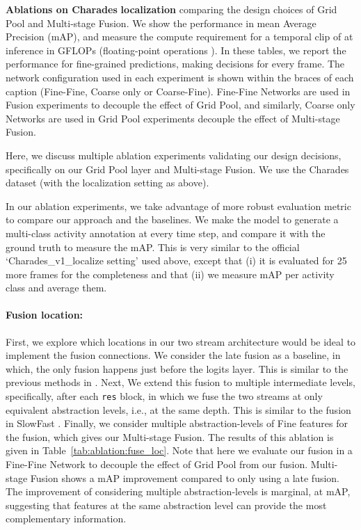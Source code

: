 \documentclass[final]{cvpr}
\newcommand{\tref}[1]{Table~\ref{#1}}
\begin{document}
\begin{table*}[t!]
		\vspace{0.5em}
		\caption{\textbf{Ablations on Charades} \cite{sigurdsson2016hollywood} \textbf{localization} comparing the design choices of Grid Pool and Multi-stage Fusion. We show the performance in mean Average Precision (mAP), and measure the compute requirement for a temporal clip of  at inference in GFLOPs (floating-point operations ). In these tables, we report the performance for fine-grained predictions, making decisions for every frame. The network configuration used in each experiment is shown within the braces of each caption (Fine-Fine, Coarse only or Coarse-Fine). Fine-Fine Networks are used in Fusion experiments to decouple the effect of Grid Pool, and similarly, Coarse only Networks are used in Grid Pool experiments decouple the effect of Multi-stage Fusion.}
		\label{tab:ablations}
		\vspace{-4mm}
\end{table*}
	
Here, we discuss multiple ablation experiments validating our design decisions, specifically on our Grid Pool layer and Multi-stage Fusion. We use the Charades dataset (with the localization setting as above).

In our ablation experiments, we take advantage of more robust evaluation metric to compare our approach and the baselines. We make the model to generate a multi-class activity annotation at every time step, and compare it with the ground truth to measure the mAP. This is very similar to the official `Charades\_v1\_localize setting' used above, except that (i) it is evaluated for 25 more frames for the completeness and that (ii) we measure mAP per activity class and average them.

\vspace{-3pt}
\paragraph{Fusion location:} First, we explore which locations in our two stream architecture would be ideal to implement the fusion connections. We consider the late fusion as a baseline, in which, the only fusion happens just before the logits layer. This is similar to the previous methods in \cite{piergiovanni2018learning, piergiovanni2019temporal}. Next, We extend this fusion to multiple intermediate levels, specifically, after each \texttt{res} block, in which we fuse the two streams at only equivalent abstraction levels, i.e., at the same depth. This is similar to the fusion in SlowFast \cite{feichtenhofer2019slowfast}. Finally, we consider multiple abstraction-levels of Fine features for the fusion, which gives our Multi-stage Fusion. The results of this ablation is given in \tref{tab:ablation:fuse_loc}. Note that here we evaluate our fusion in a Fine-Fine Network to decouple the effect of Grid Pool from our fusion. Multi-stage Fusion shows a  mAP improvement compared to only using a late fusion. The improvement of considering multiple abstraction-levels is marginal, at  mAP, suggesting that features at the same abstraction level can provide the most complementary information.
\end{document}
